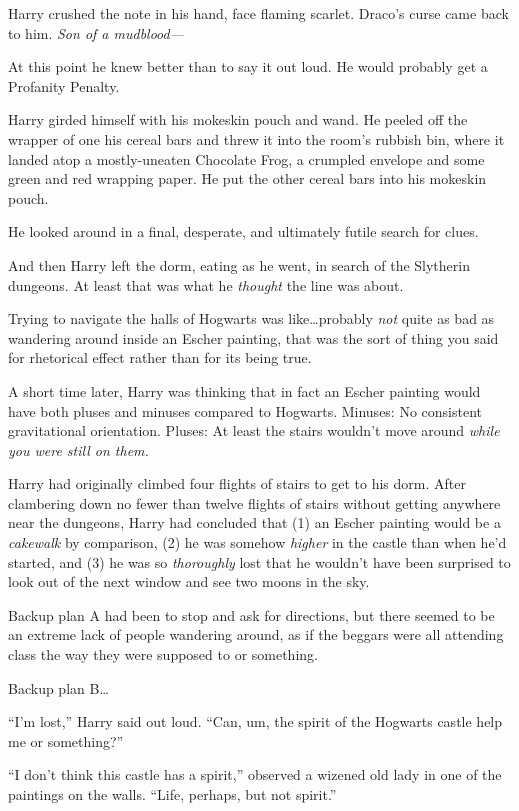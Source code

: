 Harry crushed the note in his hand, face flaming scarlet. Draco’s curse came back to him. \emph{Son of a mudblood—}

At this point he knew better than to say it out loud. He would probably get a Profanity Penalty.

Harry girded himself with his mokeskin pouch and wand. He peeled off the wrapper of one his cereal bars and threw it into the room’s rubbish bin, where it landed atop a mostly-uneaten Chocolate Frog, a crumpled envelope and some green and red wrapping paper. He put the other cereal bars into his mokeskin pouch.

He looked around in a final, desperate, and ultimately futile search for clues.

And then Harry left the dorm, eating as he went, in search of the Slytherin dungeons. At least that was what he \emph{thought} the line was about.

Trying to navigate the halls of Hogwarts was like…probably \emph{not} quite as bad as wandering around inside an Escher painting, that was the sort of thing you said for rhetorical effect rather than for its being true.

A short time later, Harry was thinking that in fact an Escher painting would have both pluses and minuses compared to Hogwarts. Minuses: No consistent gravitational orientation. Pluses: At least the stairs wouldn’t move around \emph{while you were still on them.}

Harry had originally climbed four flights of stairs to get to his dorm. After clambering down no fewer than twelve flights of stairs without getting anywhere near the dungeons, Harry had concluded that (1) an Escher painting would be a \emph{cakewalk} by comparison, (2) he was somehow \emph{higher} in the castle than when he’d started, and (3) he was so \emph{thoroughly} lost that he wouldn’t have been surprised to look out of the next window and see two moons in the sky.

Backup plan A had been to stop and ask for directions, but there seemed to be an extreme lack of people wandering around, as if the beggars were all attending class the way they were supposed to or something.

Backup plan B…

“I’m lost,” Harry said out loud. “Can, um, the spirit of the Hogwarts castle help me or something?”

“I don’t think this castle has a spirit,” observed a wizened old lady in one of the paintings on the walls. “Life, perhaps, but not spirit.”

